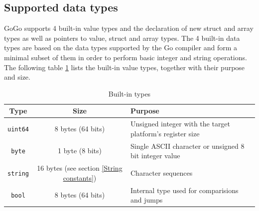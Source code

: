 \documentclass[a4paper]{scrartcl}
\let\section\subsection
\let\subsection\subsubsection
\let\subsubsection\paragraph
\let\paragraph\subparagraph
\let\subparagraph\undefined
\begin{document}
    \section{Supported data types}
      GoGo supports 4 built-in value types and the declaration of new struct and array types as well as pointers to value, struct and array types. The 4 built-in data types are based on the data types supported by the Go compiler and form a minimal subset of them in order to perform basic integer and string operations. The following table \ref{tbl:types} lists the built-in value types, together with their purpose and size.
      
      \begin{table}[htb]
      \centering
      \begin{tabular}{cc p{}}
        \toprule
        \textbf{Type} & \textbf{Size} & \textbf{Purpose}\\
        \midrule
        \texttt{uint64} & 8 bytes (64 bits) & Unsigned integer with the target platform's register size\\
        \texttt{byte} & 1 byte (8 bits) & Single ASCII character or unsigned 8 bit integer value\\
        \texttt{string} & 16 bytes (see section \ref{String constants}) & Character sequences\\
        \texttt{bool} & 8 bytes (64 bits) & Internal type used for comparisions and jumps\\
        \bottomrule
      \end{tabular}
      \caption{Built-in types}
      \label{tbl:types}
	  \end{table}
\end{document}
